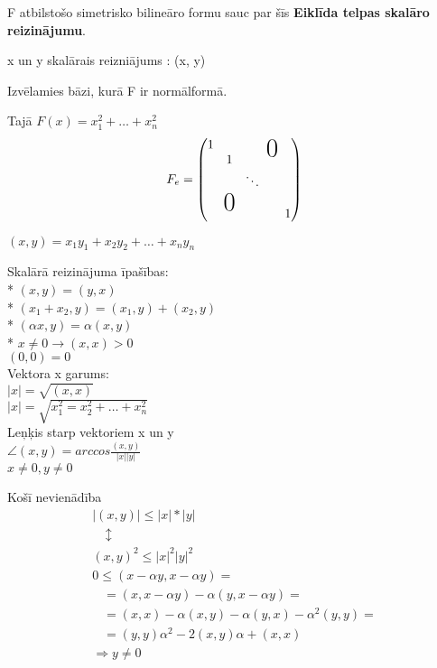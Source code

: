 \documentclass[12pt]{article}
\begin{document}
F atbilstošo simetrisko bilineāro formu sauc par šīs \textbf{Eiklīda telpas skalāro reizinājumu}. 

x un y skalārais reizniājums : (x, y)

Izvēlamies bāzi, kurā F ir normālformā.

\newcommand\x{\times}
\newcommand\bigzero{\makebox(0,0){\text{\huge0}}}
\newcommand*{\bord}{\multicolumn{1}{c|}{}}

Tajā $F(x)= x_1^2+ \ldots + x_n^2 $
\begin{gather*}
	F_e = 
	\begin{pmatrix}
	1 & && \bigzero   \\ 
    	& 1 &  \\
	& &  \ddots  &\\ 
        & \bigzero  &  \\
    	& &  & &  1  \\ 	
    \end{pmatrix}
\end{gather*}

$(x,y) = x_1y_1 + x_2y_2 + \ldots + x_ny_n$

Skalārā reizinājuma īpašības: \\
* $(x,y) = (y,x)$ \\
* $(x_1+x_2, y) = (x_1,y) + (x_2,y)$ \\
* $(\alpha x,y)= \alpha(x,y)$ \\
* $ x \neq 0 \rightarrow (x,x) > 0$ \\
$(0,0) = 0$ \\

Vektora x garums: \\
$|x| = \sqrt{(x,x)}$ \\
$|x| = \sqrt{x_1^2 = x_2^2 + \ldots + x_n^2}$ \\

Leņķis starp vektoriem x un y \\
$\angle (x,y) = arccos \frac{(x,y)}{|x||y|}$ \\ 
$x \neq 0, y \neq 0$

\pagebreak

Košī nevienādība
\begin{gather*}
|(x,y)| \leq |x| * |y|  \\
  \quad \updownarrow \\
(x,y)^2 \leq |x|^2 |y|^2  \\
 0 \leq (x - \alpha y, x-\alpha y) =  \\
 \; \; \; = (x, x - \alpha y) - \alpha (y, x - \alpha y) = \\
 \; \; \; =  (x,x) - \alpha (x,y) - \alpha (y,x) - \alpha^2 (y,y) = \\
 \; \; \; = (y,y) \alpha^2 - 2 (x,y) \alpha + (x,x) \\
\Rightarrow  y \neq 0
\end{gather*}
\end{document}
